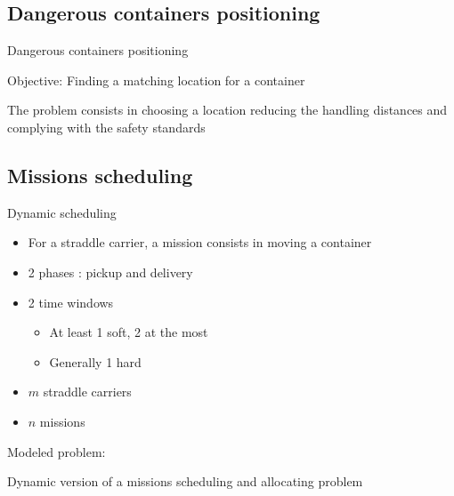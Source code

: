 \documentclass{beamer}
\begin{document}
\subsection*{Dangerous containers positioning}
\begin{frame}{Dangerous containers positioning}
  \begin{block}{Objective:}
    Finding a matching location for a container
  \end{block}
  \pause
  The problem consists in choosing a location reducing the handling distances and complying with the safety standards
  \end{frame}

    \subsection*{Missions scheduling}
\begin{frame}{Dynamic scheduling}
 \begin{itemize}   
   \item For a straddle carrier, a mission consists in moving a container
   \pause
    \item 2 phases : pickup and delivery
    \pause
    \item 2 time windows
    \pause
      \begin{itemize}
	\item At least 1 soft, 2 at the most
	\pause
	\item Generally 1 hard
      \end{itemize} 
    \pause
    \item $m$ straddle carriers
    \item $n$ missions
\end{itemize}
\pause
\begin{block}{ Modeled problem: }
   	\begin{minipage}[]{\columnwidth}
		Dynamic version of a missions scheduling and allocating problem %
	\end{minipage}
  \end{block}
  \end{frame}
\end{document}
